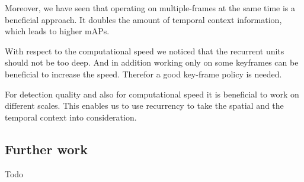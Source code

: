 \documentclass[conference]{IEEEtran}
\begin{document}
Moreover, we have seen that operating on multiple-frames at the same time is a beneficial approach. It doubles the amount of temporal context information, which leads to higher mAPs. \newline

With respect to the computational speed we noticed that the recurrent units should not be too deep. And in addition working only on some keyframes can be beneficial to increase the speed. Therefor a good key-frame policy is needed. \newline

For detection quality and also for computational speed it is beneficial to work on different scales. This enables us to use recurrency to take the spatial and the temporal context into consideration. 

\subsection{Further work}
Todo
\end{document}
